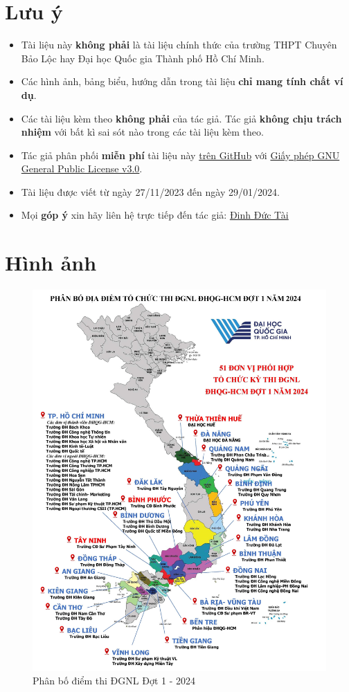 \section{Lưu ý}
\begin{itemize}
\item Tài liệu này \textbf{không phải} là tài liệu chính thức của trường THPT Chuyên Bảo Lộc hay Đại học Quốc gia Thành phố Hồ Chí Minh.
\item Các hình ảnh, bảng biểu, hướng dẫn trong tài liệu \textbf{chỉ mang tính chất ví dụ}.
\item Các tài liệu kèm theo \textbf{không phải} của tác giả. Tác giả \textbf{không chịu trách nhiệm} với bất kì sai sót nào trong các tài liệu kèm theo.
\item Tác giả phân phối \textbf{miễn phí} tài liệu này \href{https://github.com/ductai05/DGNL_2024}{trên GitHub} với \href{https://github.com/ductai05/DGNL_2024/blob/main/LICENSE}{Giấy phép GNU General Public License v3.0}. 
\item Tài liệu được viết từ ngày 27/11/2023 đến ngày 29/01/2024.
\item Mọi \textbf{góp ý} xin hãy liên hệ trực tiếp đến tác giả: \href{https://facebook.com/ductai05}{Đinh Đức Tài}
\end{itemize}
\section{Hình ảnh}
\begin{figure}
    \centering
    \includegraphics[width=1\linewidth]{img/Phan-bo-diem-thi-DGNL-Dot-1-2024.jpg}
    \caption{Phân bố điểm thi ĐGNL Đợt 1 - 2024}
    \label{fig:phanbodiemthi_dot1}
\end{figure}
\newpage
